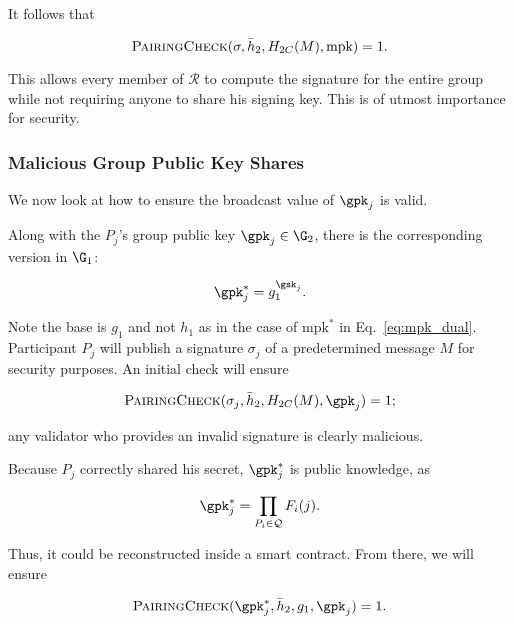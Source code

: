 \noindent
It follows that

\begin{equation}
    \textsc{PairingCheck}(\sigma,\bar{h}_{2},H_{2C}(M),\text{mpk}) = 1.
\end{equation}

\noindent
This allows every member of $\mathcal{R}$ to compute the signature
for the entire group while not requiring anyone to share his
signing key.
This is of utmost importance for security.



\subsubsection{Malicious Group Public Key Shares}

We now look at how to ensure the broadcast value of
$\gpk_{j}$ is valid.

Along with the $P_{j}$'s group public key $\gpk_{j}\in\G_{2}$,
there is the corresponding version in $\G_{1}$:

\begin{equation}
    \gpk_{j}^{*} = g_{1}^{\gsk_{j}}.
\end{equation}

\noindent
Note the base is $g_{1}$ and not $h_{1}$ as in the case of $\text{mpk}^{*}$
in Eq.~\eqref{eq:mpk_dual}.
Participant $P_{j}$ will publish a signature $\sigma_{j}$ of a predetermined
message $M$ for security purposes.
An initial check will ensure

\begin{equation}
    \textsc{PairingCheck}(\sigma_{j},\bar{h}_{2},H_{2C}(M),\gpk_{j}) = 1;
\end{equation}

\noindent
any validator who provides an invalid signature
is clearly malicious.

Because $P_{j}$ correctly shared his secret, $\gpk_{j}^{*}$
is public knowledge, as

\begin{equation}
    \gpk_{j}^{*} = \prod_{P_{i}\in\mathcal{Q}}F_{i}(j).
    \label{eq:gpkj_star_def}
\end{equation}

\noindent
Thus, it could be reconstructed inside a smart contract.
From there, we will ensure

\begin{equation}
    \textsc{PairingCheck}(\gpk_{j}^{*},\bar{h}_{2},g_{1},\gpk_{j}) = 1.
\end{equation}

